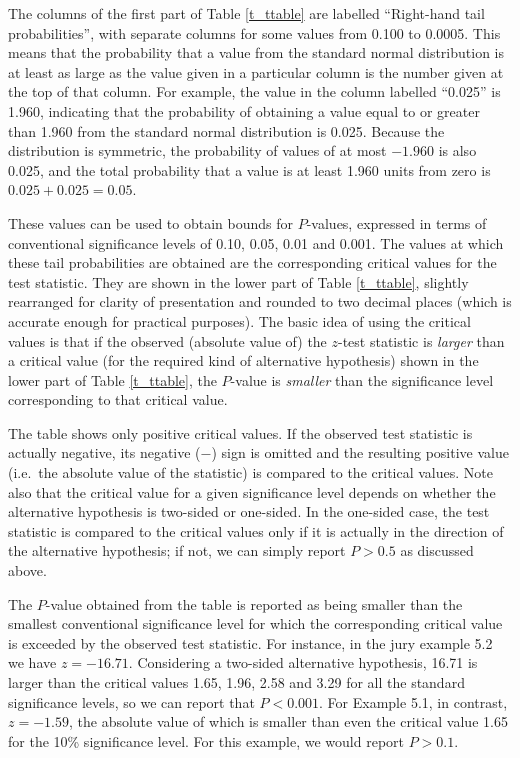 The columns of the first part of Table \ref{t_ttable} are labelled
``Right-hand tail probabilities'', with separate columns for some values
from 0.100 to 0.0005. This means that the probability that a value from
the standard normal distribution is at least as large as
the value given in a particular column is the
number given at the top of that column. For example, the value in the
column labelled ``0.025'' is 1.960, indicating that the probability of
obtaining a value equal to or greater than 1.960 from the standard normal
distribution is 0.025. Because the distribution is symmetric, the
probability of values of at most $-1.960$ is also 0.025, and the total
probability that a value is at least 1.960 units from zero is
$0.025+0.025=0.05$.

These values can be used to obtain bounds for $P$-values, expressed in
terms of conventional  significance levels of 0.10, 0.05, 0.01 and
0.001. The values at which these tail probabilities are obtained are the
corresponding critical values for the test statistic. They are shown in
the lower part of Table \ref{t_ttable}, slightly rearranged for clarity
of presentation and rounded to two decimal places (which is accurate
enough for practical purposes).
The basic idea of using the critical values is that if the observed
(absolute value of) the $z$-test statistic is \emph{larger} than a
critical value (for the required kind of alternative hypothesis) shown
in the lower part of Table \ref{t_ttable}, the $P$-value is
\emph{smaller} than the significance level corresponding to that
critical value.

The table shows only positive critical values. If the observed test
statistic is actually negative, its negative ($-$) sign is omitted and
the resulting positive value (i.e.\ the absolute value of the statistic)
is compared to the critical values. Note also that the critical value
for a given significance level depends on whether the alternative
hypothesis is two-sided or one-sided. In the one-sided case, the test
statistic is compared to the critical  values only if it is actually in
the direction of the alternative hypothesis; if not, we can simply
report $P>0.5$ as discussed above.

The $P$-value obtained from the table is reported as being smaller than
the smallest conventional significance level for which the corresponding
critical value is exceeded by the observed test statistic. For instance,
in the jury example 5.2 we have $z=-16.71$. Considering a two-sided
alternative hypothesis, 16.71 is larger than the critical values 1.65,
1.96, 2.58 and 3.29 for all the standard significance levels, so we can
report that $P<0.001$. For Example 5.1, in contrast, $z=-1.59$, the
absolute value of which is smaller than even the critical value 1.65 for
the 10\% significance level. For this example, we would report $P>0.1$.

